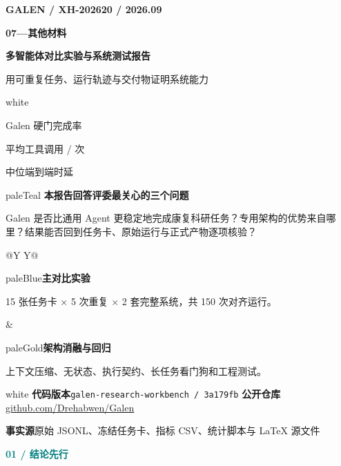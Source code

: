 \documentclass[UTF8,11pt,a4paper]{ctexart}
\newcommand{\kicker}[1]{\textcolor{teal}{\sffamily\bfseries\small #1}\par\vspace{1mm}}
\newcommand{\metric}[3]{\begin{minipage}[t]{0.30\linewidth}\centering{\color{#1}\fontsize{23}{27}\selectfont\sffamily\bfseries #2}\par{\small\color{muted}#3}\end{minipage}}
\newcommand{\code}[1]{\texttt{\small #1}}
\begin{document}
\thispagestyle{empty}
\pagecolor{paper}
\vspace*{11mm}
{\color{teal}\sffamily\bfseries\small GALEN  /  XH-202620  /  2026.09}\par
\vspace{7mm}
{\color{navy}\fontsize{28}{35}\selectfont\sffamily\bfseries 07—其他材料}\par
{\color{navy}\fontsize{23}{31}\selectfont\sffamily\bfseries 多智能体对比实验与系统测试报告}\par
\vspace{4mm}
{\color{muted}\Large 用可重复任务、运行轨迹与交付物证明系统能力}\par
\vspace{11mm}
\begin{card}{white}
\vspace{2mm}
\metric{blue}{98.7\%}{Galen 硬门完成率}\hfill
\metric{teal}{2.11}{平均工具调用 / 次}\hfill
\metric{violet}{9.2 s}{中位端到端时延}
\vspace{2mm}
\end{card}
\vspace{6mm}
\begin{card}{paleTeal}
\textbf{本报告回答评委最关心的三个问题}\par
Galen 是否比通用 Agent 更稳定地完成康复科研任务？专用架构的优势来自哪里？结果能否回到任务卡、原始运行与正式产物逐项核验？
\end{card}
\vspace{5mm}
\begin{tabularx}{\textwidth}{@{}Y Y@{}}
\begin{card}{paleBlue}\textbf{主对比实验}\par 15 张任务卡 × 5 次重复 × 2 套完整系统，共 150 次对齐运行。\end{card}&
\begin{card}{paleGold}\textbf{架构消融与回归}\par 上下文压缩、无状态、执行契约、长任务看门狗和工程测试。\end{card}
\end{tabularx}
\vfill
\begin{card}{white}
\textbf{代码版本}\quad \code{galen-research-workbench / 3a179fb}\qquad
\textbf{公开仓库}\quad \href{https://github.com/Drehabwen/Galen}{github.com/Drehabwen/Galen}\par
\textbf{事实源}\quad 原始 JSONL、冻结任务卡、指标 CSV、统计脚本与 LaTeX 源文件
\end{card}
\clearpage
\pagecolor{white}

\kicker{01  /  结论先行}
\end{document}
